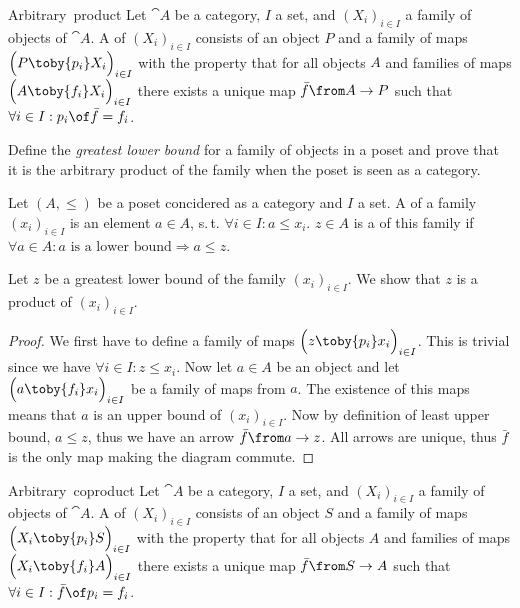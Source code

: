 
\begin{definition}{Arbitrary\ product}
  Let $\cat{A}$ be a category, $I$ a set, and $(X_i)_{i \in I}$ a family of objects of $\cat{A}$.
  A  of $(X_i)_{i \in I}$ consists of an object $P$ and a family of maps
  $\Bigl(P \toby{p_i} X_i\Bigr)_{i \in I}$
  with the property that for all objects $A$ and families of maps
  $\Bigl(A \toby{f_i} X_i\Bigr)_{i \in I}$
  there exists a unique map $\bar{f}\from A \to P$ such that
  $\forall i \in I: p_i \of \bar{f} = f_i$.
\end{definition}

\begin{exercise}
  Define the \emph{greatest lower bound} for a family of objects in a poset and prove that it is the arbitrary product of the family when the poset is seen as a category.
\end{exercise}

\begin{answer}
  Let $(A, \le)$ be a poset concidered as a category and $I$ a set.
  A  of a family $(x_i)_{i\in I}$ is an element $a \in A$, s.\,t. $\forall i \in I: a \le x_i$.
  $z \in A$ is a  of this family if $\forall a \in A: \text{$a$ is a lower bound} \Rightarrow a \le z$.

  Let $z$ be a greatest lower bound of the family $(x_i)_{i\in I}$. We show that $z$ is a product of $(x_i)_{i\in I}$.
  \begin{proof}
    We first have to define a family of maps $\Bigl(z \toby{p_i} x_i\Bigr)_{i \in I}$.
    This is trivial since we have $\forall i \in I: z \le x_i$.
    Now let $a \in A$ be an object and let $\Bigl(a \toby{f_i} x_i\Bigr)_{i \in I}$ be a family of maps from $a$.
    The existence of this maps means that $a$ is an upper bound of $(x_i)_{i\in I}$.
    Now by definition of least upper bound, $a \le z$, thus we have an arrow $\bar{f} \from a \to z$.
    All arrows are unique, thus $\bar{f}$ is the only map making the diagram commute. \qedhere
  \end{proof}
\end{answer}

\begin{definition}{Arbitrary\ coproduct}
  Let $\cat{A}$ be a category, $I$ a set, and $(X_i)_{i \in I}$ a family of objects of $\cat{A}$.
  A  of $(X_i)_{i \in I}$ consists of an object $S$ and a family of maps
  $\Bigl(X_i \toby{p_i} S\Bigr)_{i \in I}$
  with the property that for all objects $A$ and families of maps
  $\Bigl(X_i \toby{f_i} A\Bigr)_{i \in I}$
  there exists a unique map $\bar{f}\from S \to A$ such that
  $\forall i \in I: \bar{f} \of p_i = f_i$.
\end{definition}

